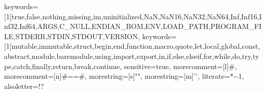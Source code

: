 {    %
    keywords=[1]{true,false,nothing,missing,im,uninitialized,NaN,NaN16,NaN32,NaN64,Inf,Inf16,Inf32,Inf64,ARGS,C_NULL,ENDIAN_BOM,ENV,LOAD_PATH,PROGRAM_FILE,STDERR,STDIN,STDOUT,VERSION},
    keywords=[1]{mutable,immutable,struct,begin,end,function,macro,quote,let,local,global,const,abstract,module,baremodule,using,import,export,in,if,else,elseif,for,while,do,try,type,catch,finally,return,break,continue},%
    sensitive=true,
    morecomment=[l]{\#},
    morecomment=[n]{\#=}{=\#},
    morestring=[s]{"}{"},
    morestring=[m]{'}{'},
    literate=*{-}{-}1,
    alsoletter=!?
}

